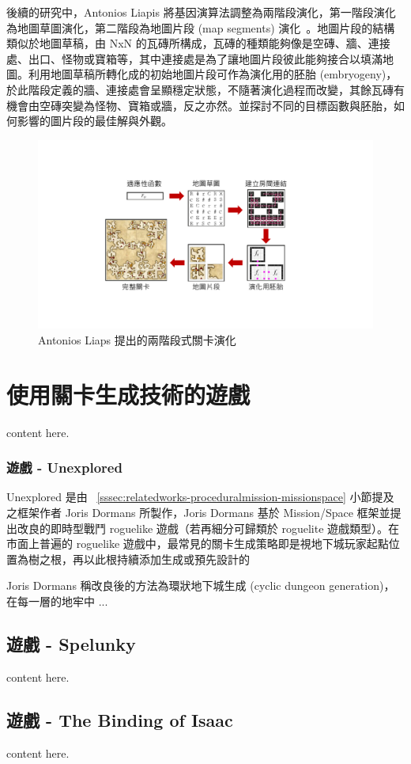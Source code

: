後續的研究中，Antonios Liapis 將基因演算法調整為兩階段演化，第一階段演化為地圖草圖演化，第二階段為地圖片段 (map segments) 演化~\cite{liapis2017multi}。地圖片段的結構類似於地圖草稿，由 NxN 的瓦磚所構成，瓦磚的種類能夠像是空磚、牆、連接處、出口、怪物或寶箱等，其中連接處是為了讓地圖片段彼此能夠接合以填滿地圖。利用地圖草稿所轉化成的初始地圖片段可作為演化用的胚胎 (embryogeny)，於此階段定義的牆、連接處會呈顯穩定狀態，不隨著演化過程而改變，其餘瓦磚有機會由空磚突變為怪物、寶箱或牆，反之亦然。並探討不同的目標函數與胚胎，如何影響的圖片段的最佳解與外觀。

\begin{figure}[ht]
  \begin{center}
    \includegraphics[width=1.0\textwidth]{figures/Multi-segment演化框架.pdf}
    \caption{Antonios Liaps 提出的兩階段式關卡演化} 
    \label{fig:multi-segment-evolution}
  \end{center}
\end{figure}



\section{使用關卡生成技術的遊戲}
\label{sec:relatedworks-gameswithprocedural}

content here.

\subsubsection{遊戲 - Unexplored}
\label{sssec:relatedworks-gameswithprocedural-unexplored}

Unexplored 是由 ~\ref{sssec:relatedworks-proceduralmission-missionspace} 小節提及之框架作者 Joris Dormans 所製作，Joris Dormans 基於 Mission/Space 框架並提出改良的即時型戰鬥 roguelike 遊戲（若再細分可歸類於 roguelite 遊戲類型）。在市面上普遍的 roguelike 遊戲中，最常見的關卡生成策略即是視地下城玩家起點位置為樹之根，再以此根持續添加生成或預先設計的

Joris Dormans 稱改良後的方法為環狀地下城生成 (cyclic dungeon generation)，在每一層的地牢中 ...

\subsection{遊戲 - Spelunky}
\label{ssec:relatedworks-gameswithprocedural-spelunky}

content here.

\subsection{遊戲 - The Binding of Isaac}
\label{ssec:relatedworks-gameswithprocedural-isaac}

content here.


